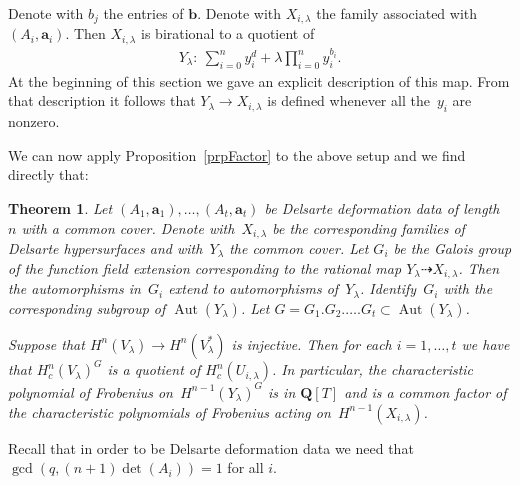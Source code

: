 \documentclass[11pt]{article}
\numberwithin{equation}{section}
\newtheorem{Theorem}{Theorem}[section]
\DeclareMathOperator{\Aut}{Aut}
\begin{document}
Denote with $b_j$ the entries of $\mathbf{b}$. Denote with $X_{i,\lambda}$ the family associated with $(A_i,\mathbf{a}_i)$. Then $X_{i,\lambda}$ is birational to a quotient of
\begin{gather*}Y_\lambda\colon \ \sum_{i=0}^n y_i^{d} +\lambda \prod_{i=0}^n y_i^{b_i}.\end{gather*}
At the beginning of this section we gave an explicit description of this map. From that description it follows that $Y_\lambda \to X_{i,\lambda}$ is def\/ined whenever all the~$y_i$ are nonzero.

We can now apply Proposition~\ref{prpFactor} to the above setup and we f\/ind directly that:

\begin{Theorem} \label{thmMainO} Let $(A_1,\mathbf{a}_1), \dots, (A_t,\mathbf{a}_t)$ be Delsarte deformation data of length $n$ with a common cover. Denote with~$X_{i,\lambda}$ be the corresponding families of Delsarte hypersurfaces and with~$Y_\lambda$ the common cover. Let $G_i$ be the Galois group of the function field extension corresponding to the rational map $Y_\lambda\dashrightarrow X_{i,\lambda}$. Then the automorphisms in~$G_i$ extend to automorphisms of~$Y_{\lambda}$. Identify~$G_i$ with the corresponding subgroup of $\Aut(Y_{\lambda})$. Let $G=G_1.G_2.\dots.G_t\subset \Aut(Y_\lambda)$.

Suppose that $H^n(V_\lambda)\to H^n(V_\lambda^*)$ is injective. Then for each $i=1,\dots,t$ we have that $H^n_c(V_{\lambda})^G$ is a quotient of $H^n_c(U_{i,\lambda})$. In particular, the characteristic polynomial of Frobenius on~$H^{n-1}(Y_\lambda)^G$ is in $\mathbf{Q}[T]$ and is a common factor of the characteristic polynomials of Frobenius acting on~$H^{n-1}(X_{i,\lambda})$.
\end{Theorem}

\begin{Remark} Recall that in order to be Delsarte deformation data we need that $\gcd(q,(n+1)\det(A_i))=1$ for all $i$.
\end{Remark}
\end{document}
